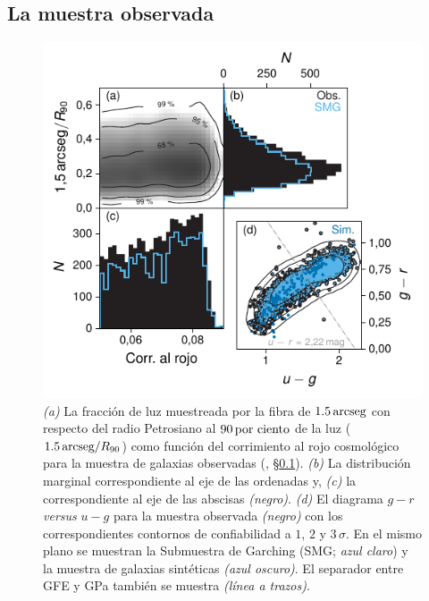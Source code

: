 \subsection{La muestra observada}\label{sc:obs-sample}
\begin{figure}
\centering
\includegraphics[scale=1]{figures/sample_chars}
%
\caption{\emph{(a)} La fracción de luz muestreada por la fibra de $\unit[1.5]{arcseg}$ con respecto
del radio Petrosiano al $\unit[90]{por ciento}$ de la luz ($\unit[1.5]{arcseg}/R_{90}$) como función
del corrimiento al rojo cosmológico para la muestra de galaxias observadas (\cf,
\S\ref{sc:obs-sample}). \emph{(b)} La distribución marginal correspondiente al eje de las ordenadas
y, \emph{(c)} la correspondiente al eje de las abscisas \emph{(negro)}. \emph{(d)} El diagrama $g-r$
\emph{versus} $u-g$ para la muestra observada \emph{(negro)} con los correspondientes contornos de
confiabilidad a $1$, $2$ y $3\,\sigma$. En el mismo plano se muestran la Submuestra de Garching
(SMG; \emph{azul claro}) y la muestra de galaxias sintéticas \emph{(azul oscuro)}. El separador
entre GFE y GPa también se muestra \emph{(línea a trazos)}.}
%
\label{fig:samples}
\end{figure}

